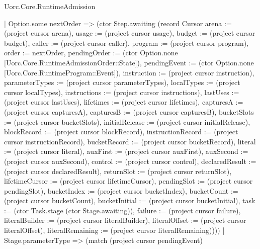 \begin{lexlean}{Uorc.Core.RuntimeAdmission}
\begin{semanticmodule}
{        | Option.some nextOrder => (ctor Step.awaiting (record Cursor {arena := (project cursor arena), usage := (project cursor usage), budget := (project cursor budget), caller := (project cursor caller), program := (project cursor program), order := nextOrder, pendingOrder := (ctor Option.none [Uorc.Core.RuntimeAdmissionOrder::State]), pendingEvent := (ctor Option.none [Uorc.Core.RuntimeProgram::Event]), instruction := (project cursor instruction), parameterTypes := (project cursor parameterTypes), localTypes := (project cursor localTypes), instructions := (project cursor instructions), lastUses := (project cursor lastUses), lifetimes := (project cursor lifetimes), capturesA := (project cursor capturesA), capturesB := (project cursor capturesB), bucketSlots := (project cursor bucketSlots), initialRelease := (project cursor initialRelease), blockRecord := (project cursor blockRecord), instructionRecord := (project cursor instructionRecord), bucketRecord := (project cursor bucketRecord), literal := (project cursor literal), auxFirst := (project cursor auxFirst), auxSecond := (project cursor auxSecond), control := (project cursor control), declaredResult := (project cursor declaredResult), returnSlot := (project cursor returnSlot), lifetimeCursor := (project cursor lifetimeCursor), pendingSlot := (project cursor pendingSlot), bucketIndex := (project cursor bucketIndex), bucketCount := (project cursor bucketCount), bucketInitial := (project cursor bucketInitial), task := (ctor Task.stage (ctor Stage.awaiting)), failure := (project cursor failure), literalBuilder := (project cursor literalBuilder), literalOffset := (project cursor literalOffset), literalRemaining := (project cursor literalRemaining)})))
      | Stage.parameterType => (match (project cursor pendingEvent)
}
\end{semanticmodule}
\end{lexlean}
